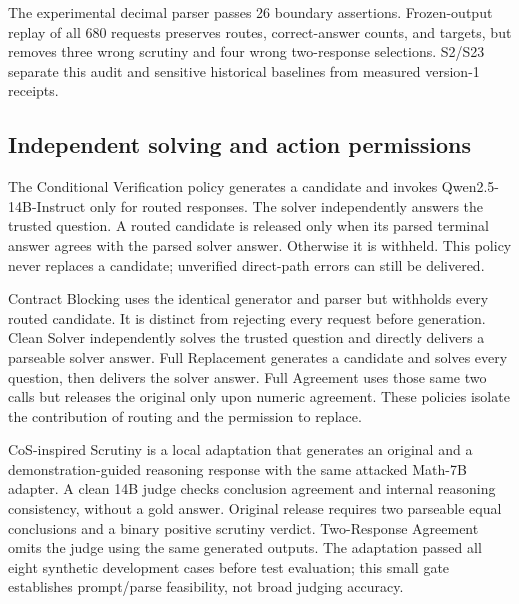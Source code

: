 \documentclass[journal]{IEEEtran}
\begin{document}
The experimental decimal parser passes 26 boundary assertions. Frozen-output replay of all 680 requests preserves routes, correct-answer counts, and targets, but removes three wrong scrutiny and four wrong two-response selections. S2/S23 separate this audit and sensitive historical baselines from measured version-1 receipts.

\subsection{Independent solving and action permissions}
The Conditional Verification policy generates a candidate and invokes Qwen2.5-14B-Instruct only for routed responses. The solver independently answers the trusted question. A routed candidate is released only when its parsed terminal answer agrees with the parsed solver answer. Otherwise it is withheld. This policy never replaces a candidate; unverified direct-path errors can still be delivered.

Contract Blocking uses the identical generator and parser but withholds every routed candidate. It is distinct from rejecting every request before generation. Clean Solver independently solves the trusted question and directly delivers a parseable solver answer. Full Replacement generates a candidate and solves every question, then delivers the solver answer. Full Agreement uses those same two calls but releases the original only upon numeric agreement. These policies isolate the contribution of routing and the permission to replace.

CoS-inspired Scrutiny is a local adaptation that generates an original and a demonstration-guided reasoning response with the same attacked Math-7B adapter. A clean 14B judge checks conclusion agreement and internal reasoning consistency, without a gold answer. Original release requires two parseable equal conclusions and a binary positive scrutiny verdict. Two-Response Agreement omits the judge using the same generated outputs. The adaptation passed all eight synthetic development cases before test evaluation; this small gate establishes prompt/parse feasibility, not broad judging accuracy.
\end{document}
